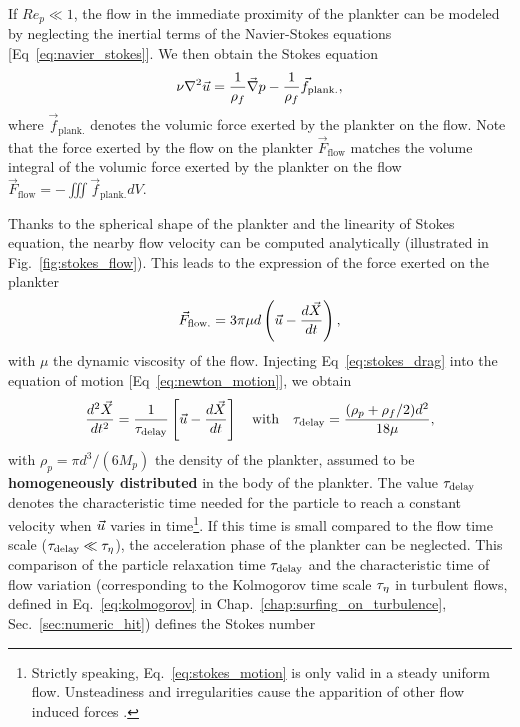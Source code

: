 If $\mathit{Re}_p \ll 1$, the flow in the immediate proximity of the plankter can be modeled by neglecting the inertial terms of the Navier-Stokes equations [Eq~\eqref{eq:navier_stokes}].
We then obtain the Stokes equation
\begin{equation}\label{eq:stokes}
	\nu \nabla^2 \vec{u} = \frac{1}{\rho_f} \vec{\nabla} p - \frac{1}{\rho_f} \vec{f}_{\mathrm{plank.}},
\end{equation}
where $\vec{f}_{\mathrm{plank.}}$ denotes the volumic force exerted by the plankter on the flow.
Note that the force exerted by the flow on the plankter $\vec{F}_{\mathrm{flow}}$ matches the volume integral of the volumic force exerted by the plankter on the flow $\vec{F}_{\mathrm{flow}} = -\iiint \vec{f}_{\mathrm{plank.}} dV$.

Thanks to the spherical shape of the plankter and the linearity of Stokes equation, the nearby flow velocity can be computed analytically (illustrated in Fig.~\ref{fig:stokes_flow}).
This leads to the expression of the force exerted on the plankter \citep{stokes1851effect}
\begin{equation}\label{eq:stokes_drag}
	\vec{F}_{\mathrm{flow.}} = 3 \pi \mu d \left( \vec{u} - \frac{d\vec{X}}{dt} \right),
\end{equation}
with $\mu$ the dynamic viscosity of the flow.
Injecting Eq~\eqref{eq:stokes_drag} into the equation of motion [Eq~\eqref{eq:newton_motion}], we obtain
\begin{equation}\label{eq:stokes_motion}
	\frac{d^2 \vec{X}}{d t^2} = \frac{1}{\tau_{\mathrm{delay}}} \left[ \vec{u} - \frac{d\vec{X}}{dt} \right] \quad \text{with} \quad \tau_{\mathrm{delay}} = \frac{(\rho_p + \rho_f/2) d^2}{18 \mu},
\end{equation}
with $\rho_p = \pi d^3/(6 M_p)$ the density of the plankter, assumed to be \textbf{homogeneously distributed} in the body of the plankter.
The value $\tau_{\mathrm{delay}}$ denotes the characteristic time needed for the particle to reach a constant velocity when $\vec{u}$ varies in time\footnote{Strictly speaking, Eq.~\eqref{eq:stokes_motion} is only valid in a steady uniform flow. Unsteadiness and irregularities cause the apparition of other flow induced forces \citep{maxey1987motion, wang2012unsteady, more2020motion}.}.
If this time is small compared to the flow time scale ($\tau_{\mathrm{delay}} \ll \tau_{\eta}$), the acceleration phase of the plankter can be neglected.
This comparison of the particle relaxation time $\tau_{\mathrm{delay}}$ and the characteristic time of flow variation (corresponding to the Kolmogorov time scale $\tau_{\eta}$ in turbulent flows, defined in Eq.~\ref{eq:kolmogorov} in Chap.~\ref{chap:surfing_on_turbulence}, Sec.~\ref{sec:numeric_hit}) defines the Stokes number
